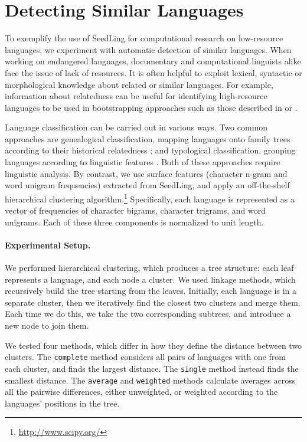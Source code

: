 \section{Detecting Similar Languages} \label{sec:cluster}

To exemplify the use of SeedLing for computational research on low-resource languages, we experiment with automatic detection of similar languages. When working on endangered languages, documentary and computational linguists alike face the issue of lack of resources. It is often helpful to exploit lexical, syntactic or morphological knowledge about related or similar languages. For example, information about relatedness can be useful for identifying high-resource languages to be used in bootstrapping approaches such as those described in  or .

Language classification can be carried out in various ways. Two common approaches are genealogical classification, mapping languages onto family trees according to their historical relatedness \cite{swadesh1952,starostin2010}; and typological classification, grouping languages according to linguistic features \cite{georgi2010wals,daume2009}. Both of these approaches require linguistic analysis. By contrast, we use surface features (character n-gram and word unigram frequencies) extracted from SeedLing, and apply an off-the-shelf hierarchical clustering algorithm.\footnote{\url{http://www.scipy.org/}} Specifically, each language is represented as a vector of frequencies of character bigrams, character trigrams, and word unigrams. Each of these three components is normalized to unit length.

\paragraph{Experimental Setup.}
We performed hierarchical clustering, which produces a tree structure: each leaf represents a language, and each node a cluster. We used linkage methods, which recursively build the tree starting from the leaves. Initially, each language is in a separate cluster, then we iteratively find the closest two clusters and merge them. Each time we do this, we take the two corresponding subtrees, and introduce a new node to join them.

We tested four methods, which differ in how they define the distance between two clusters. The \texttt{complete} method considers all pairs of languages with one from each cluster, and finds the largest distance. The \texttt{single} method instead finds the smallest distance. The \texttt{average} and \texttt{weighted} methods calculate averages across all the pairwise differences, either unweighted, or weighted according to the languages' positions in the tree.

